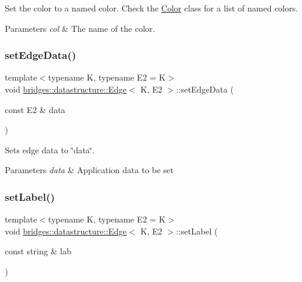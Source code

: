 Set the color to a named color. Check the \hyperlink{classbridges_1_1datastructure_1_1_color}{Color} class for a list of named colors. 


\begin{DoxyParams}{Parameters}
{\em col} & The name of the color. \\
\hline
\end{DoxyParams}
\mbox{\label{classbridges_1_1datastructure_1_1_edge_a8f030413780f15f90141e4ff29240ec0}} 
\subsubsection{\texorpdfstring{set\+Edge\+Data()}{setEdgeData()}}
{\footnotesize\ttfamily template$<$typename K, typename E2 = K$>$ \\
void \hyperlink{classbridges_1_1datastructure_1_1_edge}{bridges\+::datastructure\+::\+Edge}$<$ K, E2 $>$\+::set\+Edge\+Data (\begin{DoxyParamCaption}\item[{const E2 \&}]{data }\end{DoxyParamCaption})\hspace{0.3cm}{\ttfamily [inline]}}



Sets edge data to \char`\"{}data\char`\"{}. 


\begin{DoxyParams}{Parameters}
{\em data} & Application data to be set \\
\hline
\end{DoxyParams}
\mbox{\label{classbridges_1_1datastructure_1_1_edge_a5f88c4db54027da70de06f21fd5b6ccd}} 
\subsubsection{\texorpdfstring{set\+Label()}{setLabel()}}
{\footnotesize\ttfamily template$<$typename K, typename E2 = K$>$ \\
void \hyperlink{classbridges_1_1datastructure_1_1_edge}{bridges\+::datastructure\+::\+Edge}$<$ K, E2 $>$\+::set\+Label (\begin{DoxyParamCaption}\item[{const string \&}]{lab }\end{DoxyParamCaption})\hspace{0.3cm}{\ttfamily [inline]}}



